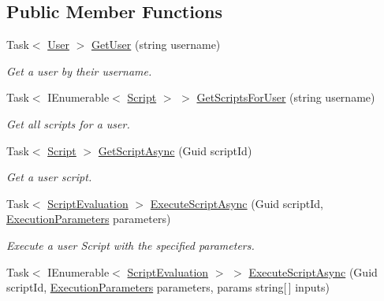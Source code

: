 \subsection*{Public Member Functions}
\begin{DoxyCompactItemize}
\item 
Task$<$ \mbox{\hyperlink{class_code_a_friend_1_1_data_model_1_1_user}{User}} $>$ \mbox{\hyperlink{interface_code_a_friend_1_1_facade_1_1_i_code_a_friend_facade_a2f9f5a0cf07b54b171af4770e519c30b}{Get\+User}} (string username)
\begin{DoxyCompactList}\small\item\em Get a user by their username.\end{DoxyCompactList}\item 
Task$<$ I\+Enumerable$<$ \mbox{\hyperlink{class_code_a_friend_1_1_data_model_1_1_script}{Script}} $>$ $>$ \mbox{\hyperlink{interface_code_a_friend_1_1_facade_1_1_i_code_a_friend_facade_acc0a8e1606ff89320a2cdbcb69f9d338}{Get\+Scripts\+For\+User}} (string username)
\begin{DoxyCompactList}\small\item\em Get all scripts for a user.\end{DoxyCompactList}\item 
Task$<$ \mbox{\hyperlink{class_code_a_friend_1_1_data_model_1_1_script}{Script}} $>$ \mbox{\hyperlink{interface_code_a_friend_1_1_facade_1_1_i_code_a_friend_facade_af180522d16e16c3c7eb69324d87278c0}{Get\+Script\+Async}} (Guid script\+Id)
\begin{DoxyCompactList}\small\item\em Get a user script.\end{DoxyCompactList}\item 
Task$<$ \mbox{\hyperlink{class_code_a_friend_1_1_data_model_1_1_script_evaluation}{Script\+Evaluation}} $>$ \mbox{\hyperlink{interface_code_a_friend_1_1_facade_1_1_i_code_a_friend_facade_abd81f62f5431cd404c9503ff2cfe7e9f}{Execute\+Script\+Async}} (Guid script\+Id, \mbox{\hyperlink{class_code_a_friend_1_1_data_model_1_1_execution_parameters}{Execution\+Parameters}} parameters)
\begin{DoxyCompactList}\small\item\em Execute a user Script with the specified parameters.\end{DoxyCompactList}\item 
Task$<$ I\+Enumerable$<$ \mbox{\hyperlink{class_code_a_friend_1_1_data_model_1_1_script_evaluation}{Script\+Evaluation}} $>$ $>$ \mbox{\hyperlink{interface_code_a_friend_1_1_facade_1_1_i_code_a_friend_facade_a7a3f1a746d41872d14197a8949781ce2}{Execute\+Script\+Async}} (Guid script\+Id, \mbox{\hyperlink{class_code_a_friend_1_1_data_model_1_1_execution_parameters}{Execution\+Parameters}} parameters, params string\mbox{[}$\,$\mbox{]} inputs)

\end{DoxyCompactItemize}
